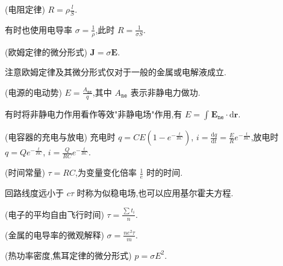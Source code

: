     \begin{theorem}
        (电阻定律) $R=\rho \frac{l}{S}$.
    \end{theorem}
    有时也使用电导率 $\sigma=\frac{1}{\rho}$,此时 $R=\frac{1}{\sigma S}$.
    \begin{theorem}
        (欧姆定律的微分形式) $\bm{J}=\sigma \bm{E}$.
    \end{theorem}
    注意欧姆定律及其微分形式仅对于一般的金属或电解液成立.
    \begin{definition}
        (电源的电动势) $E=\frac{A_{\texttt{ne}}}{q}$,其中 $A_{\texttt{ne}}$ 表示非静电力做功.
    \end{definition}
    有时将非静电力作用看作等效"非静电场"作用,有 $E=\int_{}^{}\bm{E}_{\texttt{ne}}\cdot \mathrm{d}\bm{r}$.
    \begin{theorem}
        (电容器的充电与放电) 充电时 $q=CE\left( 1-e^{-\frac{t}{RC}} \right) $, $i=\frac{\mathrm{d}q}{\mathrm{d}t}=\frac{E}{R}e^{-\frac{t}{RC}}$,放电时 $q=Qe^{-\frac{t}{RC}}$, $i=\frac{Q}{RC}e^{-\frac{t}{RC}}$.
    \end{theorem}
    \begin{definition}
        (时间常量) $\tau=RC$,为变量变化倍率 $\frac{1}{e}$ 时的时间.
    \end{definition}
    回路线度远小于 $c\tau$ 时称为似稳电场,也可以应用基尔霍夫方程.
    \begin{definition}
        (电子的平均自由飞行时间) $\tau=\frac{\sum_{}^{}t_{i}}{n}$.
    \end{definition}
    \begin{theorem}
        (金属的电导率的微观解释) $\sigma=\frac{ne^2\tau}{m}$.
    \end{theorem}
    \begin{definition}
        (热功率密度,焦耳定律的微分形式) $p=\sigma E^2$.
    \end{definition}
